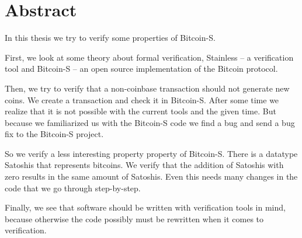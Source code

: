 \chapter*{Abstract}
\label{chap:abstract}

In this thesis we try to verify some properties of Bitcoin-S.

First, we look at some theory about formal verification, Stainless -- a verification tool and Bitcoin-S -- an open source implementation of the Bitcoin protocol.

Then, we try to verify that a non-coinbase transaction should not generate new coins.
We create a transaction and check it in Bitcoin-S.
After some time we realize that it is not possible with the current tools and the given time.
But because we familiarized us with the Bitcoin-S code we find a bug and send a bug fix to the Bitcoin-S project.

So we verify a less interesting property property of Bitcoin-S.
There is a datatype Satoshis that represents bitcoins. We verify that the addition of Satoshis with zero results in the same amount of Satoshis.
Even this needs many changes in the code that we go through step-by-step.

Finally, we see that software should be written with verification tools in mind, because otherwise the code possibly must be rewritten when it comes to verification.
